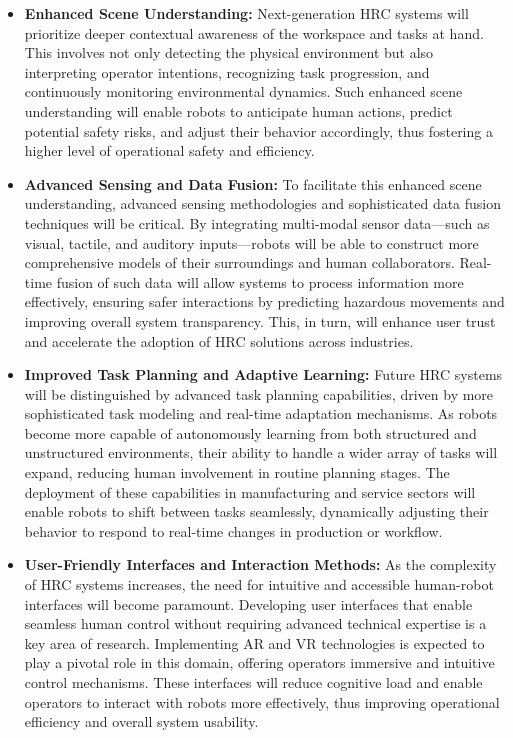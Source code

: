 \begin{itemize}
    \item \textbf{Enhanced Scene Understanding:} Next-generation \ac{HRC} systems will prioritize deeper contextual awareness of the workspace and tasks at hand. This involves not only detecting the physical environment but also interpreting operator intentions, recognizing task progression, and continuously monitoring environmental dynamics. Such enhanced scene understanding will enable robots to anticipate human actions, predict potential safety risks, and adjust their behavior accordingly, thus fostering a higher level of operational safety and efficiency.

    \item \textbf{Advanced Sensing and Data Fusion:} To facilitate this enhanced scene understanding, advanced sensing methodologies and sophisticated data fusion techniques will be critical. By integrating multi-modal sensor data—such as visual, tactile, and auditory inputs—robots will be able to construct more comprehensive models of their surroundings and human collaborators. Real-time fusion of such data will allow systems to process information more effectively, ensuring safer interactions by predicting hazardous movements and improving overall system transparency. This, in turn, will enhance user trust and accelerate the adoption of \ac{HRC} solutions across industries.

    \item \textbf{Improved Task Planning and Adaptive Learning:} Future \ac{HRC} systems will be distinguished by advanced task planning capabilities, driven by more sophisticated task modeling and real-time adaptation mechanisms. As robots become more capable of autonomously learning from both structured and unstructured environments, their ability to handle a wider array of tasks will expand, reducing human involvement in routine planning stages. The deployment of these capabilities in manufacturing and service sectors will enable robots to shift between tasks seamlessly, dynamically adjusting their behavior to respond to real-time changes in production or workflow.

    \item \textbf{User-Friendly Interfaces and Interaction Methods:} As the complexity of \ac{HRC} systems increases, the need for intuitive and accessible human-robot interfaces will become paramount. Developing user interfaces that enable seamless human control without requiring advanced technical expertise is a key area of research. Implementing \ac{AR} and \ac{VR} technologies is expected to play a pivotal role in this domain, offering operators immersive and intuitive control mechanisms. These interfaces will reduce cognitive load and enable operators to interact with robots more effectively, thus improving operational efficiency and overall system usability.


\end{itemize}
